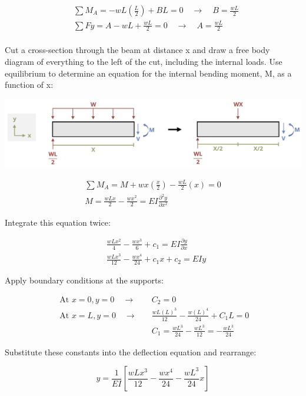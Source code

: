 \documentclass[
  letterpaper,
  DIV=11,
  numbers=noendperiod]{scrreprt}
\theoremstyle{definition}
\theoremstyle{remark}
\begin{document}
\begin{tcolorbox}
\begin{tcolorbox}
\[
\begin{aligned}
& \sum M_A=-wL\left(\frac{L}{2}\right)+B L=0 \quad \rightarrow \quad B=\frac{wL}{2} \\
& \sum F y= A-wL+\frac{wL}{2}=0 \quad\rightarrow\quad A=\frac{wL}{2} \\
& \end{aligned}
\]

Cut a cross-section through the beam at distance x and draw a free body
diagram of everything to the left of the cut, including the internal
loads. Use equilibrium to determine an equation for the internal bending
moment, M, as a function of x:

\begin{center}
\includegraphics{images/CH11 PNGs/example11.1-3.png}
\end{center}

\[
\begin{gathered} \sum M_A= M+w x\left(\frac{x}{2}\right)-\frac{w L}{2}(x)=0 \\ M =\frac{w L x}{2}-\frac{w x^2}{2}=E I \frac{\partial^2 y}{\partial x^2}\end{gathered}
\]

Integrate this equation twice:

\[
\begin{aligned} & \frac{w L x^2}{4}-\frac{w x^3}{6}+c_1=E I \frac{\partial y}{\partial x} \\ & \frac{w L x^3}{12}-\frac{w x^4}{24}+c_1 x+c_2=E I y\end{aligned}
\]

Apply boundary conditions at the supports:

\[
\begin{aligned}
\text { At } x=0, y=0 \quad\rightarrow\quad &C_2=0 \\
\text { At } x=L, y=0 \quad\rightarrow\quad &\frac{w L(L)^3}{12}-\frac{w(L)^4}{24}+C_1 L=0 \\
& C_1=\frac{w L^3}{24}-\frac{wL^3}{12}=-\frac{w L^3}{24}\end{aligned}
\]

Substitute these constants into the deflection equation and rearrange:

\[
y=\frac{1}{E I}\left[\frac{w L x^3}{12}-\frac{w x^4}{24}-\frac{wL^3}{24} x\right]
\]


\end{tcolorbox}
\end{tcolorbox}
\end{document}
